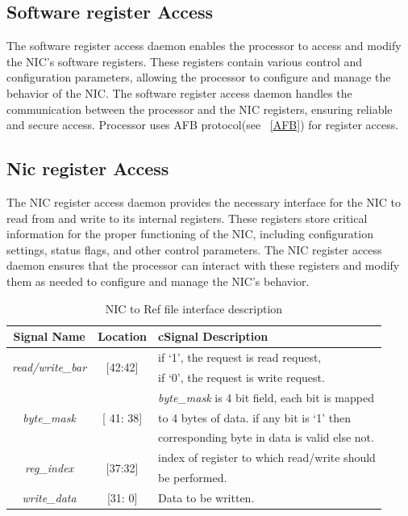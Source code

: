 \documentclass[a4paper,11pt, final]{report}
\begin{document}
		\subsection{Software register Access}
				The software register access daemon enables the processor to access and modify the NIC's software registers. These registers contain various control and configuration parameters, allowing the processor to configure and manage the behavior of the NIC. The software register access daemon handles the communication between the processor and the NIC registers, ensuring reliable and secure access. Processor uses AFB protocol(see ~\ref{AFB}) for register access.\\

	

		\subsection{Nic register Access}
				The NIC register access daemon provides the necessary interface for the NIC to read from and write to its internal registers. These registers store critical information for the proper functioning of the NIC, including configuration settings, status flags, and other control parameters. The NIC register access daemon ensures that the processor can interact with these registers and modify them as needed to configure and manage the NIC's behavior.\\
		\begin{table}[!htbp]
					\centering
					\begin{tabular}{ccl}
						\hline
						\textbf{Signal Name} 			& \textbf{Location} 		&{c}\textbf{Signal Description}  \\ \hline
						\multirow{2}{*}{\textit{read/write\_bar}}& \multirow{2}{*}{[42:42]}	& if `1', the request is read request,\\ 
											& 				& if `0', the request is write request.\\ \hline
						\multirow{3}{*}{\textit{byte\_mask}}	& \multirow{3}{*}{[ 41: 38]}	& \textit{byte\_mask} is 4 bit field, each bit is mapped\\
											&				& to 4 bytes of data. if any bit is `1' then\\
											& 				& corresponding byte in data is valid else not.\\ \hline 
						\multirow{2}{*}{\textit{reg\_index}}   	& \multirow{2}{*}{[37:32]} 	& index of register to which read/write should\\ 
											&				& be performed.\\ \hline
						\textit{write\_data}   			& [31: 0] 			& Data to be written.\\ \hline
					\end{tabular}
					\caption{NIC to Ref file interface description}
					\label{tab:NIC-Reg-interface-req}
				\end{table}
\end{document}
